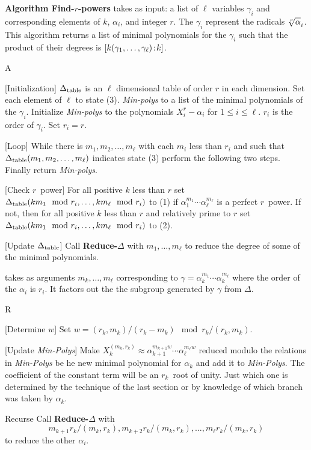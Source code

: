 \medskip
\noindent
{\bf Algorithm Find-$r$\th-powers} takes as input: a list of $\ell$ variables
$\gamma_i$  and corresponding elements of $k$, $\alpha_i$, and integer
$r$.  The $\gamma_i$ represent the radicals $\root r \of \alpha_i$.
This algorithm returns a list of minimal polynomials for the $\gamma_i$
such that the product of their degrees is
$[k(\gamma_1, \ldots, \gamma_\ell)\!:\!k]$.

\begin{algorithm}{A}
\item {[Initialization]} $\mathop{\Delta_{\rm table}}$ is an $\ell$ dimensional table of
order $r$ in each dimension.  Set each element of $\ell$ to state (3).
{\em Min-polys} to a list of the minimal polynomials of the $\gamma_i$.
Initialize {\em Min-polys} to the polynomials $X_i^r - \alpha_i$ for $1 \le
i \le \ell$.  $r_i$ is the order of $\gamma_i$.  Set $r_i = r$. 

\item {[Loop]}  While there is $m_1, m_2, \ldots, m_\ell$ with each
$m_i$ less than $r_i$ and such that $\mathop{\Delta_{\rm table}}(m_1, m_2, \ldots, m_\ell)$
indicates state (3) perform the following two steps.  Finally return
{\em Min-polys\/}.

\item {[Check $r$\th\ power]  }
For all positive $k$ less than $r$ set $\mathop{\Delta_{\rm table}}(k m_1 \mod{r_i}, \ldots, k
m_\ell \mod{r_i})$ to (1) if
$\alpha_1^{m_1} \cdots \alpha_\ell^{m_\ell}$ is a perfect $r$\th\ power.
If not, then for all positive $k$ less than $r$  and relatively prime to
$r$ set $\mathop{\Delta_{\rm table}}(k m_1 \mod{r_i}, \ldots, k m_\ell \mod{r_i})$ to (2).

\item {[Update $\mathop{\Delta_{\rm table}}$]}  Call {\bf Reduce-$\Delta$} with $m_1,
\ldots, m_\ell$ to reduce the degree of some of the minimal
polynomials.

\end{algorithm}

\medskip
{}
takes as arguments $m_k, \ldots, m_\ell$ corresponding to 
$\gamma = \alpha_k^{m_1} \cdots \alpha_k^{m_\ell}$ where the order of
the $\alpha_i$ is $r_i$.  It factors out the the subgroup generated by
$\gamma$ from $\Delta$. 

\begin{algorithm}{R}
\item {[Determine $w$]} Set $w = (r_k, m_k)/(r_k - m_k) \mod{r_k/(r_k, m_k)}$.

\item {[Update {\em Min-Polys}]}  Make 
$X_k^{(m_k, r_k)} \approx \alpha_{k+1}^{m_{k+1} w} \cdots \alpha_\ell^{m_\ell w}$
reduced modulo the relations in {\em Min-Polys\/} be he new minimal
polynomial for $\alpha_k$ and add it to  {\em Min-Polys\/}.  The
coefficient of the constant term will be an $r_k$\th\ root of unity.
Just which one is determined by the technique of the last section or by
knowledge of which branch was taken by $\alpha_k$.

\item [Recurse]  Call {\bf Reduce-$\Delta$} with
\[ 
m_{k+1} r_k/(m_k, r_k), m_{k+2} r_k/(m_k, r_k), \ldots,
m_{\ell} r_k/(m_k, r_k)
\]
to reduce the other $\alpha_i$.

\end{algorithm}

